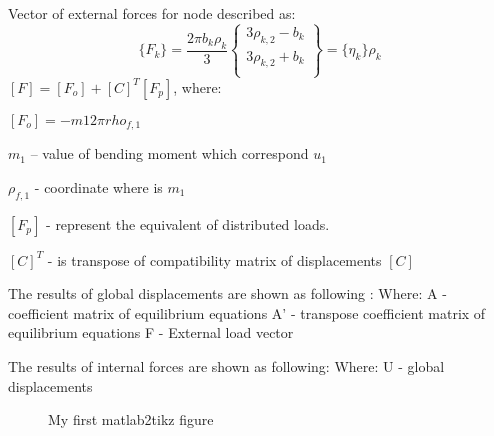 Vector of external forces for node described as:
\begin{equation}\label{eqn:ExtrLoad}
    \{F_k\}=
    \frac{2\pi b_k\rho_k}{3}
    \left\{\begin{matrix}
        3\rho_{k,2}-b_k \\[2ex]
        3\rho_{k,2}+b_k \\[2ex]
    \end{matrix}\right\}
    =
    \{\eta_k\}\rho_k
\end{equation}
$[F]=[F_o]+[C]^T[F_p]$, where:\par
$[F_o]=-m1 2\pi rho_{f,1}$\par
$m_1$ – value of bending moment which correspond $u_1$\par
$\rho_{f,1}$ - coordinate where is $m_1$\par
$[F_p]$ - represent the equivalent of distributed loads.\par
$[C]^T$ - is transpose of compatibility matrix of displacements $[C]$\par

The results of global displacements are shown as following : 
Where:
A - coefficient matrix of equilibrium equations
A' - transpose coefficient matrix of equilibrium equations
F - External load vector
\par
The results of internal forces are shown as following: 
Where:
U - global displacements
\begin{figure}
    \centering
    
    \caption{ My first matlab2tikz figure }
    \label{fig:myfirstfig}
    \end{figure}